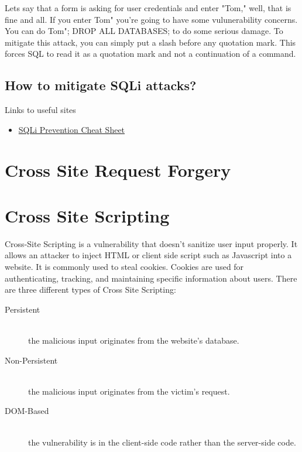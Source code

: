 \documentclass[a4paper, titlepage]{article}
\begin{document}
Lets say that a form is asking for user credentials and enter "Tom," well, that is fine and all. If you enter Tom" you're going to have some vulunerability concerns. You can do Tom"; DROP ALL DATABASES; to do some serious damage. To mitigate this attack, you can simply put a slash before any quotation mark. This forces SQL to read it as a quotation mark and not a continuation of a command.

\subsection{How to mitigate SQLi attacks?}
Links to useful sites
\begin{itemize}
    \item \href{https://www.owasp.org/index.php/SQL_Injection_Prevention_Cheat_Sheet}{SQLi Prevention Cheat Sheet}
\end{itemize}
\newpage


\section{Cross Site Request Forgery}
\newpage


\section{Cross Site Scripting}

Cross-Site Scripting is a vulnerability that doesn't sanitize user input properly. It allows an attacker to inject HTML or client side script such as Javascript into a website. It is commonly used to steal cookies. Cookies are used for authenticating, tracking, and maintaining specific information about users. There are three different types of Cross Site Scripting:
\begin{description}
    \item [Persistent] \hfill \\
        the malicious input originates from the website's database.
    \item [Non-Persistent]\hfill \\
        the malicious input originates from the victim's request.
    \item [DOM-Based]\hfill \\
        the vulnerability is in the client-side code rather than the server-side code.
\end{description}
\end{document}
